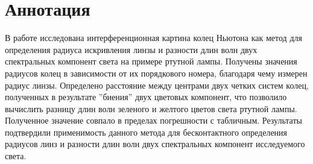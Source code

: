 \chapter*{Аннотация}

В работе исследована интерференционная картина колец Ньютона как метод для определения радиуса искривления линзы и разности длин волн двух спектральных компонент света на примере ртутной лампы. Получены значения радиусов колец в зависимости от их порядкового номера, благодаря чему измерен радиус линзы. Определено расстояние между центрами двух четких систем колец, полученных в результате ''биения'' двух цветовых компонент, что позволило вычислить разницу длин волн зеленого и желтого цветов света ртутной лампы. Полученное значение совпало в пределах погрешности с табличным. Результаты подтвердили применимость данного метода для бесконтактного определения радиусов линз и разности длин волн двух спектральных компонент исследуемого света.
